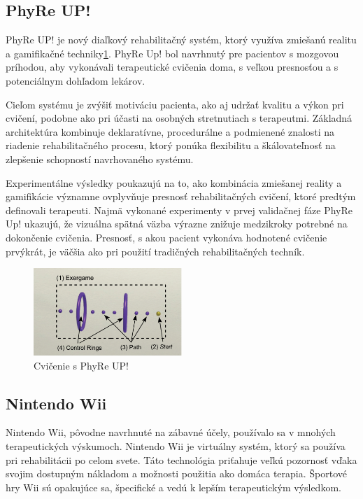 \documentclass[10pt,twoside,slovak,a4paper]{article}
\begin{document}
\subsection{PhyRe UP!}\cite{9564051}
PhyRe UP! je nový diaľkový rehabilitačný systém, ktorý využíva zmiešanú realitu a gamifikačné techniky\ref{fig:phyre}. PhyRe Up! bol navrhnutý pre pacientov s mozgovou príhodou, aby vykonávali terapeutické cvičenia doma, s veľkou presnosťou a s potenciálnym dohľadom lekárov. 

Cieľom systému je zvýšiť motiváciu pacienta, ako aj udržať kvalitu a výkon pri cvičení, podobne ako pri účasti na osobných stretnutiach s terapeutmi. Základná architektúra kombinuje deklaratívne, procedurálne a podmienené znalosti na riadenie rehabilitačného procesu, ktorý ponúka flexibilitu a škálovateľnosť na zlepšenie schopností navrhovaného systému. 

Experimentálne výsledky poukazujú na to, ako kombinácia zmiešanej reality a gamifikácie významne ovplyvňuje presnosť rehabilitačných cvičení, ktoré predtým definovali terapeuti. Najmä vykonané experimenty v prvej validačnej fáze PhyRe Up! ukazujú, že vizuálna spätná väzba výrazne znižuje medzikroky potrebné na dokončenie cvičenia. Presnosť, s akou pacient vykonáva hodnotené cvičenie prvýkrát, je väčšia ako pri použití tradičných rehabilitačných techník.

\begin{figure}[H]
    \centering
    \includegraphics[width = 0.5\textwidth]{obrazky/PhyRe UP!.png}
    \caption{Cvičenie s PhyRe UP!}
    \label{fig:phyre}
\end{figure}

\subsection{Nintendo Wii}\cite{8940302}
Nintendo Wii, pôvodne navrhnuté na zábavné účely, používalo sa v mnohých terapeutických výskumoch. Nintendo Wii je virtuálny systém, ktorý sa používa pri rehabilitácii po celom svete. Táto technológia priťahuje veľkú pozornosť vďaka svojim dostupným nákladom a možnosti použitia ako domáca terapia. Športové hry Wii sú opakujúce sa, špecifické a vedú k lepším terapeutickým výsledkom.
\end{document}
